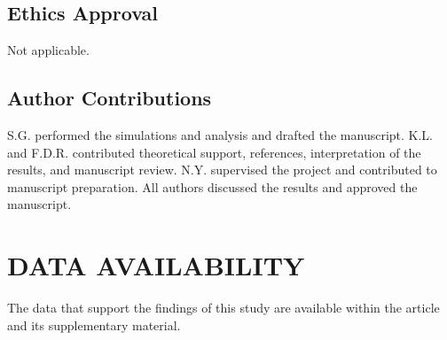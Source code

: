 \documentclass[%
 aip,
 apl,
 amsmath,amssymb,
 reprint,%
 floatfix,
]{revtex4-1}
\begin{document}
\subsection*{Ethics Approval}
Not applicable.

\subsection*{Author Contributions}
S.G. performed the simulations and analysis and drafted the manuscript. K.L. and F.D.R. contributed theoretical support, references, interpretation of the results, and manuscript review. N.Y. supervised the project and contributed to manuscript preparation. All authors discussed the results and approved the manuscript.

\section*{DATA AVAILABILITY}
The data that support the findings of this study are available within the article and its supplementary material.



\end{document}
